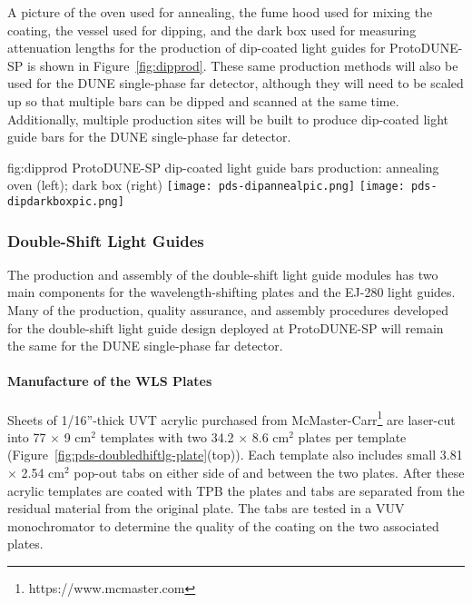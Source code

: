 A picture of the oven used for annealing, the fume hood used for mixing the coating, the vessel used for dipping, and the dark box used for measuring attenuation lengths for the production of dip-coated light guides for ProtoDUNE-SP is shown in Figure~\ref{fig:dipprod}.  These same production methods will also be used for the DUNE single-phase far detector, although they will need to be scaled up so that multiple bars can be dipped and scanned at the same time.  Additionally, multiple production sites will be built to produce dip-coated light guide bars for the DUNE single-phase far detector.

\begin{dunefigure}{fig:dipprod}
{ProtoDUNE-SP dip-coated light guide bars production: annealing oven (left); dark box (right)}
  \texttt{[image: pds-dipannealpic.png]}
  \texttt{[image: pds-dipdarkboxpic.png]}
\end{dunefigure}




\subsubsection{Double-Shift Light Guides}
\label{ssec:fdsp-pd-pc-prod-bar2}

The production and assembly of the double-shift light guide modules has two main components for the wavelength-shifting plates and the EJ-280 light guides. Many of the production, quality assurance, and assembly procedures developed for the double-shift light guide design deployed at ProtoDUNE-SP will remain the same for the DUNE single-phase far detector.
																								
\paragraph*{Manufacture of the WLS Plates}

Sheets of 1/16''-thick UVT acrylic purchased from McMaster-Carr\footnote{https://www.mcmaster.com} are laser-cut into 77 $\times$ 9 cm$^2$ templates with two 34.2 $\times$ 8.6 cm$^2$ plates per template (Figure~\ref{fig:pds-doubledhiftlg-plate}(top)). Each template also includes small 3.81 $\times$ 2.54 cm$^2$ pop-out tabs on either side of and between the two plates. After these acrylic templates are coated with TPB the plates and tabs are separated from the residual material from the original plate. The tabs are tested in a VUV monochromator to determine the quality of the coating on the two associated plates.

